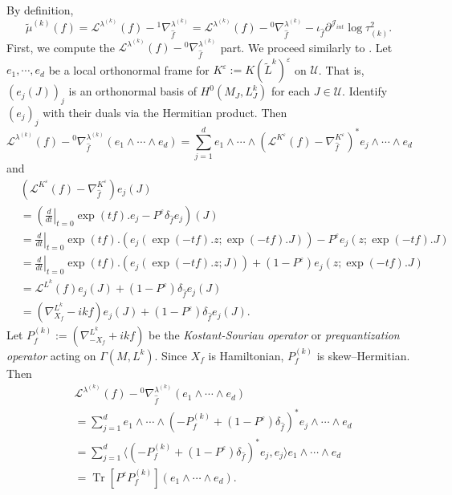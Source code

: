 \documentclass[12pt,reqno,a4paper]{amsart}
\numberwithin{equation}{section}
\DeclareMathOperator{\Tr}{Tr}
\theoremstyle{definition}
\theoremstyle{remark}
\begin{document}
By definition, 
\begin{equation*}
\widetilde{\mu}^{(k)}(f)=\mathcal{L}^{\lambda^{(k)}}(f)-{}^1\nabla^{\lambda^{(k)}}_{\widehat{f}}=\mathcal{L}^{\lambda^{(k)}}(f)-{}^0\nabla^{\lambda^{(k)}}_{\widehat{f}}-\iota_{\widehat{f}}\partial^{\mathcal{J}_{int}}\log \tau_{(k)}^2.
\end{equation*}
First, we compute the $\mathcal{L}^{\lambda^{(k)}}(f)-{}^0\nabla^{\lambda^{(k)}}_{\widehat{f}}$ part. We proceed similarly to \cite{foth2007manifold}. Let $e_1,\cdots,e_d$ be a local orthonormal frame for $K^\varepsilon:=K(\tilde{L}^k)^{\varepsilon}$ on $\mathcal{U}$. That is, $(e_j(J))_j$ is an orthonormal basis of $H^0(M_J,L_J^k)$ for each $J\in\mathcal{U}$. Identify $(e_j)_j$ with their duals via the Hermitian product. Then
\begin{equation*}
\mathcal{L}^{\lambda^{(k)}}(f)-{}^0\nabla^{\lambda^{(k)}}_{\widehat{f}}(e_1\wedge\cdots\wedge e_d)=\sum_{j=1}^d e_1\wedge\cdots\wedge\left( \mathcal{L}^{K^\varepsilon}(f)-\nabla^{K^\varepsilon}_{\widehat{f}}\right)^*e_j\wedge\cdots\wedge e_d
\end{equation*}
and
\begin{align*}
&\left(\mathcal{L}^{K^\varepsilon}(f)-\nabla^{K^\varepsilon}_{\widehat{f}}\right)e_j(J)\\
&=\left(\left.\frac{d}{dt}\right|_{t=0} \exp{(tf)}.e_j-P^\varepsilon \delta_{\widehat{f}} e_j \right) (J)\\
&=\left.\frac{d}{dt}\right|_{t=0} \exp{(tf)}.(e_j(\exp{(-tf)}.z;\exp{(-tf)}.J))-P^\varepsilon e_j(z;\exp{(-tf)}.J)\\
&=\left.\frac{d}{dt}\right|_{t=0} \exp{(tf)}.(e_j(\exp{(-tf)}.z;J))+(1-P^\varepsilon)e_j(z;\exp{(-tf)}.J)\\
&=\mathcal{L}^{L^k}(f)e_j(J)+(1-P^\varepsilon)\delta_{\widehat{f}}e_j(J)\\
&=(\nabla^{L^k}_{X_f}-ikf)e_j(J)+(1-P^\varepsilon)\delta_{\widehat{f}}e_j(J).
\end{align*}
Let $P^{(k)}_f:=(\nabla^{L^k}_{-X_f}+ikf)$ be the \textit{Kostant-Souriau operator} or \textit{prequantization operator} acting on $\Gamma(M,L^k)$. Since $X_f$ is Hamiltonian, $P^{(k)}_f$ is skew--Hermitian.
Then
\begin{align*}
&\mathcal{L}^{\lambda^{(k)}}(f)-{}^0\nabla^{\lambda^{(k)}}_{\widehat{f}}(e_1\wedge\cdots\wedge e_d)\\
&=\sum_{j=1}^d e_1\wedge\cdots\wedge\left( -P^{(k)}_f +(1-P^\varepsilon )\delta_{\widehat{f}}\right)^* e_j\wedge\cdots\wedge e_d\\
&=\sum_{j=1}^d \langle (-P^{(k)}_f +(1-P^\varepsilon )\delta_{\widehat{f}})^*e_j,e_j \rangle e_1\wedge\cdots\wedge e_d\\
&=\Tr[P^\varepsilon P^{(k)}_f](e_1\wedge\cdots\wedge e_d).
\end{align*}
\end{document}
